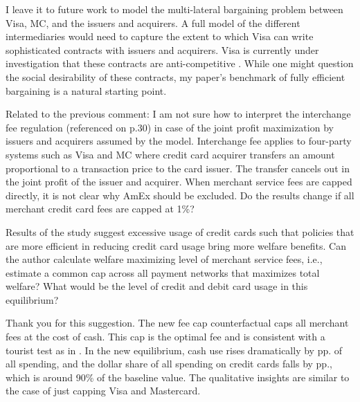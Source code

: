 \documentclass[main.tex]{subfiles}
\begin{document}
\begin{refsection}
I leave it to future work to model the multi-lateral bargaining problem between Visa, MC, and the issuers and acquirers.
A full model of the different intermediaries would need to capture the extent to which Visa can write sophisticated contracts with issuers and acquirers.
Visa is currently under investigation that these contracts are anti-competitive \parencite{Au-Yeung2024}.
While one might question the social desirability of these contracts, my paper's benchmark of fully efficient bargaining is a natural starting point.

\begin{refcomment}
Related to the previous comment: I am not sure how to interpret the interchange fee regulation (referenced on p.30) in case of the joint profit maximization by issuers and acquirers assumed by the model.
Interchange fee applies to four-party systems such as Visa and MC where credit card acquirer transfers an amount proportional to a transaction price to the card issuer.
The transfer cancels out in the joint profit of the issuer and acquirer.
When merchant service fees are capped directly, it is not clear why AmEx should be excluded.
Do the results change if all merchant credit card fees are capped at 1\%?

Results of the study suggest excessive usage of credit cards such that policies that are more efficient in reducing credit card usage bring more welfare benefits.
Can the author calculate welfare maximizing level of merchant service fees, i.e., estimate a common cap across all payment networks that maximizes total welfare?
What would be the level of credit and debit card usage in this equilibrium?
\end{refcomment}

Thank you for this suggestion.
The new fee cap counterfactual caps all merchant fees at the cost of cash.
This cap is the optimal fee and is consistent with a tourist test as in \textcite{Rochet.Tirole2011}.
In the new equilibrium, cash use rises dramatically by  pp. of all spending, and the dollar share of all spending on credit cards falls by  pp., which is around 90\% of the baseline value.
The qualitative insights are similar to the case of just capping Visa and Mastercard.



\end{refsection}
\end{document}
